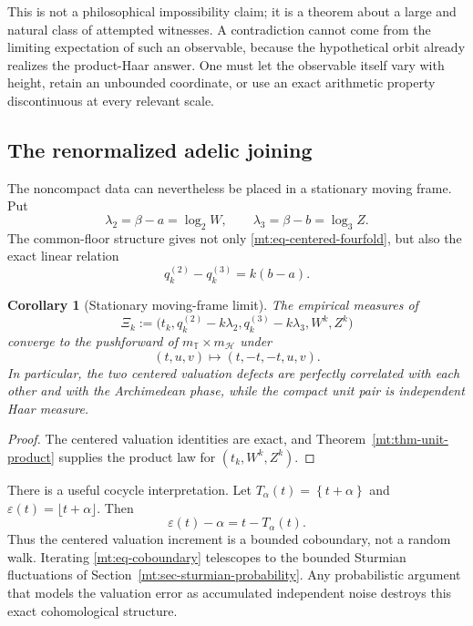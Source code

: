 \documentclass[11pt,oneside]{article}
\newtheorem{corollary}[theorem]{Corollary}
\theoremstyle{definition}
\theoremstyle{remark}
\newcommand{\Torus}{\mathbb T}
\newcommand{\fract}[1]{\left\{#1\right\}}
\begin{document}
This is not a philosophical impossibility claim; it is a theorem about a large and natural
class of attempted witnesses.  A contradiction cannot come from the limiting expectation of
such an observable, because the hypothetical orbit already realizes the product-Haar answer.
One must let the observable itself vary with height, retain an unbounded coordinate, or use an
exact arithmetic property discontinuous at every relevant scale.

\subsection{The renormalized adelic joining}

The noncompact data can nevertheless be placed in a stationary moving frame.  Put
\begin{equation}
 \lambda_2=\beta-a=\log_2W,
 \qquad
 \lambda_3=\beta-b=\log_3Z.
 \label{mt:eq-lambda23}
\end{equation}
The common-floor structure gives not only
\eqref{mt:eq-centered-fourfold}, but also the exact linear relation
\begin{equation}
 q^{(2)}_k-q^{(3)}_k=k(b-a).
 \label{mt:eq-q-difference}
\end{equation}

\begin{corollary}[Stationary moving-frame limit]
\label{mt:cor-moving-frame}
The empirical measures of
\begin{equation}
 \Xi_k:=
 \bigl(t_k,
       q^{(2)}_k-k\lambda_2,
       q^{(3)}_k-k\lambda_3,
       W^k,Z^k\bigr)
 \label{mt:eq-Xik}
\end{equation}
converge to the pushforward of
$m_\Torus\times m_{\mathcal H}$ under
\begin{equation}
 (t,u,v)\longmapsto(t,-t,-t,u,v).
 \label{mt:eq-moving-frame-map}
\end{equation}
In particular, the two centered valuation defects are perfectly correlated with each other
and with the Archimedean phase, while the compact unit pair is independent Haar measure.
\end{corollary}

\begin{proof}
The centered valuation identities are exact, and
Theorem~\ref{mt:thm-unit-product} supplies the product law for $(t_k,W^k,Z^k)$.
\end{proof}

There is a useful cocycle interpretation.  Let
$T_\alpha(t)=\fract{t+\alpha}$ and
$\varepsilon(t)=\lfloor t+\alpha\rfloor$.  Then
\begin{equation}
 \varepsilon(t)-\alpha=t-T_\alpha(t).
 \label{mt:eq-coboundary}
\end{equation}
Thus the centered valuation increment is a bounded coboundary, not a random walk.  Iterating
\eqref{mt:eq-coboundary} telescopes to the bounded Sturmian fluctuations of
Section~\ref{mt:sec-sturmian-probability}.  Any probabilistic argument that models the
valuation error as accumulated independent noise destroys this exact cohomological structure.
\end{document}
